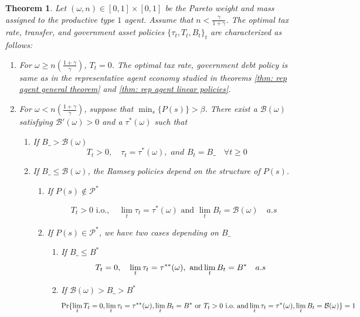 \documentclass[thmsb,11pt]{article}
\newtheorem{theorem}{Theorem}
\begin{document}
\begin{theorem}
\label{thm heterogeneous agents}
Let $(\omega,n) \in [0,1] \times [0,1]$ be the Pareto weight and mass assigned to the  productive type $1$ agent.  Assume that $n<\frac{\gamma}{1+\gamma}$.
The optimal tax rate, transfer, and government asset policies $\{\tau_t,T_t,B_t\}_t$ are characterized as follows:


\begin{enumerate}
 \item For $\omega\geq n \left(\frac{1+\gamma}{\gamma}\right)$,  $T_t=0$.  The optimal tax rate, government debt policy is same as in the representative agent economy studied in
 theorems \ref{thm: rep agent general theorem} and \ref{thm: rep agent linear policies}.
 \item For $\omega< n \left(\frac{1+\gamma}{\gamma}\right)$, suppose that $\min_{s}\{P(s)\}>\beta$. There exist  a $\mathcal{B}(\omega)$  satisfying $\mathcal{B}'(\omega)>0$ and a $\tau^*(\omega)$ such that
 \begin{enumerate}
  \item If $B\_>\mathcal{B(\omega)}$
\[T_t>0, \quad \tau_t=\tau^*(\omega), \textit{ and } B_t=B\_ \quad \forall t \geq 0 \]
\item If $B\_\leq \mathcal{B(\omega)}$, the Ramsey policies depend on the structure of $P(s)$.
\begin{enumerate}
 \item If $P(s)\not \in \mathcal{P}^*$

   \[ T_t>0 \text{ i.o.},\quad \lim_t\tau_t=\tau^*(\omega) \text{ and } \lim_tB_t=\mathcal{B}(\omega)\quad \textit{a.s}\]

 \item If $P(s)\in \mathcal{P}^*$, we have two cases depending on $B\_$
\begin{enumerate}
 \item If $B\_\leq B^*$
 \[T_t = 0, \quad \lim_t \tau_t=\tau^{**} (\omega), \ {\rm  and } \lim_tB_t=  B^*\quad a.s \]
\item If $\mathcal{B}(\omega)>B\_>B^*$
\small
\[\Pr\{\lim_t T_t = 0, \lim_t \tau_t=\tau^{**}(\omega),\lim_tB_t=  B^* \textrm{ or }  T_t>0 \text{ i.o.} \ {\rm and } \lim_t\tau_t=\tau^*(\omega), \lim_tB_t=\mathcal{B}(\omega) \}=1 \]
 \normalsize
\end{enumerate}



 \end{enumerate}

 \end{enumerate}

 \end{enumerate}


\end{theorem}
\end{document}
